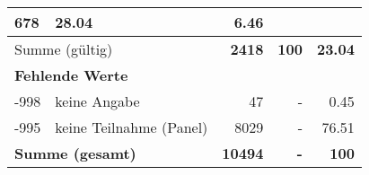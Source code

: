 \begin{longtable}{lXrrr}
       \num{678} &
       \num[round-mode=places,round-precision=2]{28,04} &
         \num[round-mode=places,round-precision=2]{6,46} \\
     \midrule
     \multicolumn{2}{l}{Summe (gültig)} &
       \textbf{\num{2418}} &
     \textbf{100} &
       \textbf{\num[round-mode=places,round-precision=2]{23,04}} \\
     \multicolumn{5}{l}{\textbf{Fehlende Werte}}\\
       -998 &
       keine Angabe &
         \num{47} &
        - &
         \num[round-mode=places,round-precision=2]{0,45} \\
       -995 &
       keine Teilnahme (Panel) &
         \num{8029} &
        - &
         \num[round-mode=places,round-precision=2]{76,51} \\
     \midrule
     \multicolumn{2}{l}{\textbf{Summe (gesamt)}} &
          \textbf{\num{10494}} &
        \textbf{-} &
        \textbf{100} \\
     \bottomrule
     \end{longtable}
     
